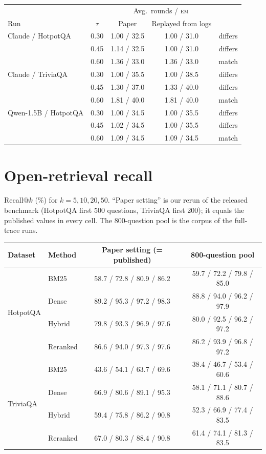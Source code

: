 \documentclass[11pt]{article}
\newcommand{\EM}{\textsc{em}}
\begin{document}
\begin{center}
\small
\begin{tabular}{lcccc}
\toprule
& & \multicolumn{2}{c}{Avg.\ rounds / \EM{}} & \\
Run & $\tau$ & Paper & Replayed from logs & \\
\midrule
Claude / HotpotQA & 0.30 & 1.00 / 32.5 & 1.00 / 31.0 & differs \\
 & 0.45 & 1.14 / 32.5 & 1.00 / 31.0 & differs \\
 & 0.60 & 1.36 / 33.0 & 1.36 / 33.0 & match \\
Claude / TriviaQA & 0.30 & 1.00 / 35.5 & 1.00 / 38.5 & differs \\
 & 0.45 & 1.30 / 37.0 & 1.33 / 40.0 & differs \\
 & 0.60 & 1.81 / 40.0 & 1.81 / 40.0 & match \\
Qwen-1.5B / HotpotQA & 0.30 & 1.00 / 34.5 & 1.00 / 35.5 & differs \\
 & 0.45 & 1.02 / 34.5 & 1.00 / 35.5 & differs \\
 & 0.60 & 1.09 / 34.5 & 1.09 / 34.5 & match \\
\bottomrule
\end{tabular}
\end{center}

\section{Open-retrieval recall}
\label{app:recall}

Recall@$k$ (\%) for $k = 5, 10, 20, 50$. ``Paper setting'' is our rerun of the released benchmark (HotpotQA first 500 questions, TriviaQA first 200); it equals the published values in every cell. The 800-question pool is the corpus of the full-trace runs.

\begin{center}
\small
\begin{tabular}{llcc}
\toprule
Dataset & Method & Paper setting (= published) & 800-question pool \\
\midrule
\multirow{4}{*}{HotpotQA} & BM25 & 58.7 / 72.8 / 80.9 / 86.2 & 59.7 / 72.2 / 79.8 / 85.0 \\
& Dense & 89.2 / 95.3 / 97.2 / 98.3 & 88.8 / 94.0 / 96.2 / 97.9 \\
& Hybrid & 79.8 / 93.3 / 96.9 / 97.6 & 80.0 / 92.5 / 96.2 / 97.2 \\
& Reranked & 86.6 / 94.0 / 97.3 / 97.6 & 86.2 / 93.9 / 96.8 / 97.2 \\
\midrule
\multirow{4}{*}{TriviaQA} & BM25 & 43.6 / 54.1 / 63.7 / 69.6 & 38.4 / 46.7 / 53.4 / 60.6 \\
& Dense & 66.9 / 80.6 / 89.1 / 95.3 & 58.1 / 71.1 / 80.7 / 88.6 \\
& Hybrid & 59.4 / 75.8 / 86.2 / 90.8 & 52.3 / 66.9 / 77.4 / 83.5 \\
& Reranked & 67.0 / 80.3 / 88.4 / 90.8 & 61.4 / 74.1 / 81.3 / 83.5 \\
\bottomrule
\end{tabular}
\end{center}
\end{document}
